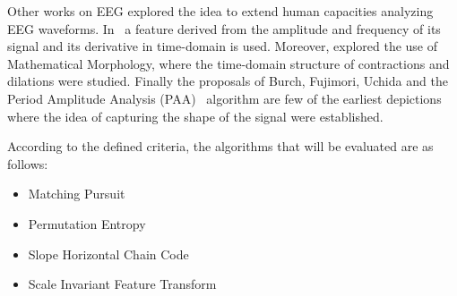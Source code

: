 \documentclass[brainsci,article,accept,moreauthors,pdftex,10pt,a4paper]{mdpi}
\begin{document}
Other works on EEG explored the idea to extend human capacities analyzing EEG waveforms. In~\cite{Klein1976} a feature derived from the amplitude and frequency of its signal and its derivative in time-domain is used.  Moreover, \citep{Yamaguchi2009} explored the use of Mathematical Morphology, where the time-domain structure of contractions and dilations were studied. Finally the proposals of Burch, Fujimori, Uchida and the Period Amplitude Analysis (PAA)~\citep{Uchida1996} algorithm are few of the earliest depictions where the idea of capturing the shape of the signal were established.



%
%
%
%
%
%
%
%
%
%

According to the defined criteria, the algorithms that will be evaluated are as follows:

\begin{itemize}[leftmargin=*,labelsep=5.8mm]
\item Matching Pursuit
\item Permutation Entropy
\item Slope Horizontal Chain Code
\item Scale Invariant Feature Transform
\end{itemize}
\end{document}
